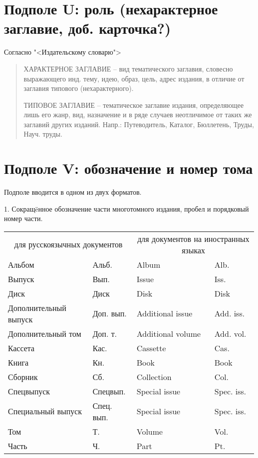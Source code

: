 
\section{Подполе U: роль (нехарактерное заглавие, доб. карточка?)}

Согласно "<Издательскому словарю">

\begin{quotation}
	ХАРАКТЕРНОЕ ЗАГЛАВИЕ -- вид тематического заглавия, словесно выражающего инд. тему, идею, образ, цель, адрес издания, в отличие от заглавия типового (нехарактерного).
	
	ТИПОВОЕ ЗАГЛАВИЕ -- тематическое заглавие издания, определяющее лишь его жанр, вид, назначение и в ряде случаев неотличимое от таких же заглавий других изданий. Напр.: Путеводитель, Каталог, Бюллетень, Труды, Науч. труды.	
\end{quotation}


\section{Подполе V: обозначение и номер тома}

Подполе вводится в одном из двух форматов.

1. Сокращ\"eнное обозначение части многотомного издания, пробел и порядковый номер части.

{\noindent\scriptsize\begin{tabular}{|l|l|l|l|}
	\hline 
	\thead{Обозначение части} & \thead{Сокращение}  & \thead{Обозначение части}  & \thead{Сокращение}  \\ 
	\hline 
	\multicolumn{2}{|c|}{для русскоязычных документов} &  \multicolumn{2}{|c|}{для документов на иностранных языках}  \\ 
	\hline 
	Альбом & Альб. & Album & Alb.  \\ 
	\hline 
	Выпуск &  Вып. &  Issue & Iss.  \\ 
	\hline 
	Диск &  Диск &  Disk & Disk  \\ 
	\hline 
	Дополнительный выпуск &  Доп. вып. & Additional issue & Add. iss.  \\ 
	\hline 
	Дополнительный том &  Доп. т. &  Additional volume & Add. vol.  \\ 
	\hline 
	Кассета & Кас. &  Cassette & Cas. \\ 
	\hline 
	Книга & Кн. & Book & Book \\ 
	\hline 
	Сборник &  Сб. & Collection & Col.  \\ 
	\hline 
	Спецвыпуск & Спецвып. & Special issue & Spec. iss. \\ 
	\hline 
	Специальный выпуск &  Спец. вып. & Special issue & Spec. iss. \\ 
	\hline 
	Том &  Т. & Volume & Vol. \\ 
	\hline 
	Часть &  Ч. & Part  & Pt.  \\ 
	\hline 
\end{tabular} 
}
